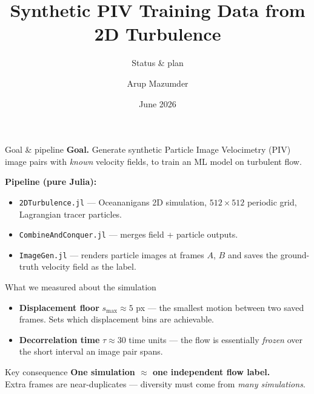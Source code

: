 \documentclass[aspectratio=169]{beamer}
\title{Synthetic PIV Training Data from 2D Turbulence}
\subtitle{Status \& plan}
\author{Arup Mazumder}
\institute{Surf Lab, University of Rhode Island}
\date{June 2026}
\begin{document}
\begin{frame}
  \titlepage
\end{frame}

\begin{frame}{Goal \& pipeline}
\textbf{Goal.} Generate synthetic Particle Image Velocimetry (PIV) image pairs with
\emph{known} velocity fields, to train an ML model on turbulent flow.

\vspace{1em}
\textbf{Pipeline (pure Julia):}
\begin{itemize}\setlength\itemsep{0.4em}
  \item \texttt{2DTurbulence.jl} --- Oceananigans 2D simulation, $512\times512$ periodic
        grid, Lagrangian tracer particles.
  \item \texttt{CombineAndConquer.jl} --- merges field + particle outputs.
  \item \texttt{ImageGen.jl} --- renders particle images at frames $A$, $B$ and saves the
        ground-truth velocity field as the label.
\end{itemize}
\end{frame}

\begin{frame}{What we measured about the simulation}
\begin{itemize}\setlength\itemsep{0.6em}
  \item \textbf{Displacement floor} $s_{\max}\approx 5$ px --- the smallest motion between
        two saved frames. Sets which displacement bins are achievable.
  \item \textbf{Decorrelation time} $\tau \approx 30$ time units --- the flow is essentially
        \emph{frozen} over the short interval an image pair spans.
\end{itemize}

\vspace{1em}
\begin{block}{Key consequence}
\centering
\textbf{One simulation $\approx$ one independent flow label.}\\
Extra frames are near-duplicates --- diversity must come from \emph{many simulations}.
\end{block}
\end{frame}
\end{document}
